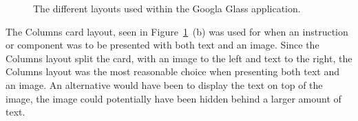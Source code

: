 	\begin{figure}[ht!]
		\centering
   		 \qquad
   		 \qquad
    		\qquad
   		 \qquad
		\caption{The different layouts used within the Googla Glass application.}
		\label{fig:cardLayout}
	\end{figure}

The Columns card layout, seen in Figure~\ref{fig:cardLayout}~(b) was used for when an instruction or component was to be presented with both text and an image. Since the Columns layout split the card, with an image to the left and text to the right, the Columns layout was the most reasonable choice when presenting both text and an image. An alternative would have been to display the text on top of the image, the image could potentially have been hidden behind a larger amount of text. 

